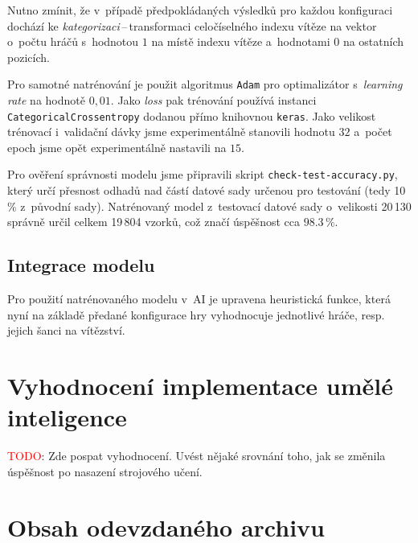 \documentclass[11pt, a4paper]{article}
\theoremstyle{definition}
\begin{document}
Nutno zmínit, že v~případě předpokládaných výsledků pro každou konfiguraci dochází ke \emph{kategorizaci}\,--\,transformaci celočíselného indexu vítěze na vektor o~počtu hráčů s~hodnotou $1$ na místě indexu vítěze a~hodnotami $0$ na ostatních pozicích.

Pro samotné natrénování je použit algoritmus \texttt{Adam} pro optimalizátor s~\emph{learning rate} na hodnotě $0,01$. Jako \emph{loss} pak trénování používá instanci \texttt{CategoricalCrossentropy} dodanou přímo knihovnou \texttt{keras}.
Jako velikost trénovací i~validační dávky jsme experimentálně stanovili hodnotu $32$ a~počet epoch jsme opět experimentálně nastavili na $15$.

Pro ověření správnosti modelu jsme připravili skript \texttt{check-test-accuracy.py}, který určí přesnost odhadů nad částí datové sady určenou pro testování (tedy 10\,\% z~původní sady). Natrénovaný model z~testovací datové sady o~velikosti
20\,130 správně určil celkem 19\,804 vzorků, což značí úspěšnost cca $98.3\,\%$.


\subsection{Integrace modelu}
Pro použití natrénovaného modelu v~AI je upravena heuristická funkce, která nyní na základě předané konfigurace hry vyhodnocuje jednotlivé hráče, resp. jejich šanci na vítězství.



\section{Vyhodnocení implementace umělé inteligence}
\label{sec:eval}

\textcolor{red}{TODO}: Zde pospat vyhodnocení. Uvést nějaké srovnání toho,
jak se změnila úspěšnost po nasazení strojového učení.


\section{Obsah odevzdaného archivu}
\label{sec:files}
\end{document}
